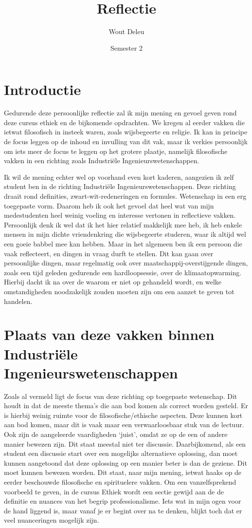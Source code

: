 \documentclass[]{article}
\title{Reflectie}
\author{Wout Deleu}
\date{Semester 2}
\begin{document}
\setlength{\parindent}{0pt} \maketitle \tableofcontents \newpage %

\section{Introductie}
Gedurende deze persoonlijke reflectie zal ik mijn mening en gevoel geven rond
deze cursus ethiek en de bijkomende opdrachten. We kregen al eerder vakken die
ietwat filosofisch in insteek waren, zoals wijsbegeerte en religie. Ik kan in
principe de focus leggen op de inhoud en invulling van dit vak, maar ik verkies
persoonlijk om iets meer de focus te leggen op het grotere plaatje, namelijk
filosofische vakken in een richting zoals Industriële Ingenieurswetenschappen.

Ik wil de mening echter wel op voorhand even kort kaderen, aangezien ik zelf
student ben in de richting Industriële Ingenieurswetenschappen. Deze richting
draait rond definities, zwart-wit-redeneringen en formules. Wetenschap in een
erg toegepaste vorm. Daarom heb ik ook het gevoel dat heel wat van mijn
medestudenten heel weinig voeling en interesse vertonen in reflectieve vakken.
Persoonlijk denk ik wel dat ik het hier relatief makkelijk mee heb, ik heb
enkele mensen in mijn dichte vriendenkring die wijsbegeerte studeren, waar ik
altijd wel een goeie babbel mee kan hebben. Maar in het algemeen ben ik een
persoon die vaak reflecteert, en dingen in vraag durft te stellen. Dit kan gaan
over persoonlijke dingen, maar regelmatig ook over maatschappij-overstijgende
dingen, zoals een tijd geleden gedurende een hardloopsessie, over de
klimaatopwarming. Hierbij dacht ik na over de waarom er niet op gehandeld
wordt, en welke omstandigheden noodzakelijk zouden moeten zijn om een aanzet te
geven tot handelen.

\section{Plaats van deze vakken binnen Industriële Ingenieurswetenschappen}
Zoals al vermeld ligt de focus van deze richting op toegepaste wetenschap. Dit
houdt in dat de meeste thema's die aan bod komen als correct worden gesteld. Er
is hierbij weinig ruimte voor de filosofische/ethische aspecten. Deze kunnen
kort aan bod komen, maar dit is vaak maar een verwaarloosbaar stuk van de
lectuur. Ook zijn de aangeleerde vaardigheden `juist', omdat ze op de een of
andere manier bewezen zijn. Dit staat meestal niet ter discussie.
Daarbijkomend, als een student een discussie start over een mogelijks
alternatieve oplossing, dan moet kunnen aangetoond dat deze oplossing op een
manier beter is dan de geziene. Dit moet kunnen bewezen worden. Dit staat, naar
mijn mening, ietwat haaks op de eerder beschouwde filosofische en spirituelere
vakken. Om een vanzelfsprekend voorbeeld te geven, in de cursus Ethiek wordt
een sectie gewijd aan de de definitie en nuances van het begrip
professionalisme. Iets wat in mijn ogen voor de hand liggend is, maar vanaf je
er begint over na te denken, blijkt toch dat er veel nuanceringen mogelijk
zijn.
\end{document}
